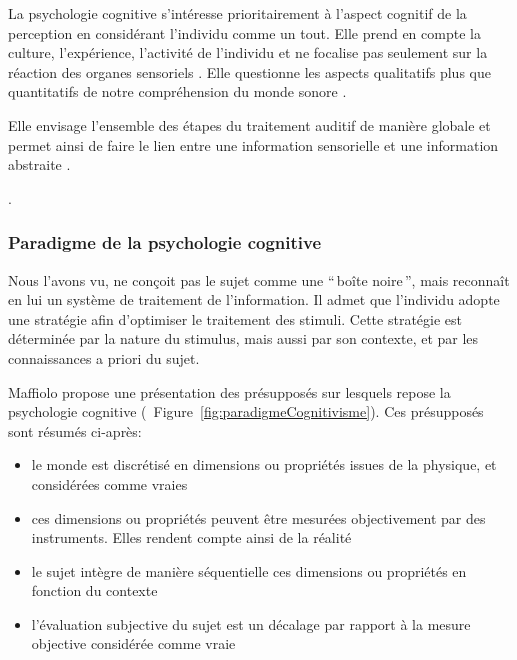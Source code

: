 La psychologie cognitive s'intéresse prioritairement à l'aspect cognitif de la perception en considérant l'individu comme un tout. Elle prend en compte la culture, l'expérience, l'activité de l'individu et ne focalise pas seulement sur la réaction des organes sensoriels . Elle questionne les aspects qualitatifs plus que quantitatifs de notre compréhension du monde sonore \citep[p. ??]{maffiolo_caracterisation_1999}.

Elle envisage l'ensemble des étapes du traitement auditif de manière globale et permet ainsi de faire le lien entre une information sensorielle et une information abstraite \citep{mcadams1994penser}.

.

\subsubsection{Paradigme de la psychologie cognitive}

Nous l'avons vu,  ne conçoit pas le sujet comme une ``\,boîte noire\,'', mais reconnaît en lui un système de traitement de l'information. Il admet que l'individu adopte une stratégie afin d'optimiser le traitement des stimuli. Cette stratégie est déterminée par la nature du stimulus, mais aussi par son contexte, et par les connaissances a priori du sujet.

Maffiolo \citep[p. ??]{maffiolo_caracterisation_1999} propose une présentation des présupposés sur lesquels repose la psychologie cognitive (\Cf~Figure~\ref{fig:paradigmeCognitivisme}). Ces présupposés sont résumés ci-après:

\begin{itemize}
\item le monde est discrétisé en dimensions ou propriétés issues de la physique, et considérées comme vraies
\item ces dimensions ou propriétés peuvent être mesurées objectivement par des instruments. Elles rendent compte ainsi de la réalité
\item le sujet intègre de manière séquentielle ces dimensions ou propriétés en fonction du contexte
\item l'évaluation subjective du sujet est  un décalage par rapport à la mesure objective considérée comme vraie
\end{itemize}

